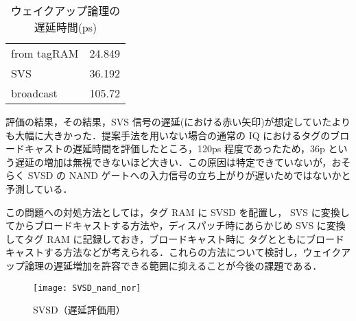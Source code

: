  \begin{table}[htb]
    \caption{ウェイクアップ論理の遅延時間(ps)}
    \footnotesize
    \center
      \begin{tabular}{l|l} \hline \hline
       from tagRAM & 24.849 \\
       SVS & 36.192 \\
       broadcast & 105.72 \\ \hline
    \end{tabular}
    \label{tab:delay}
  \end{table}

  評価の結果，その結果，SVS 信号の遅延(における赤い矢印)が想定していたよりも大幅に大きかった．提案手法を用いない場合の通常の IQ におけるタグのブロードキャストの遅延時間を評価したところ，120ps 程度であったため，36p という遅延の増加は無視できないほど大きい．この原因は特定できていないが，おそらく SVSD の NAND ゲートへの入力信号の立ち上がりが遅いためではないかと予測している．

  この問題への対処方法としては，タグ RAM に SVSD を配置し， SVS に変換してからブロードキャストする方法や，ディスパッチ時にあらかじめ SVS に変換してタグ RAM に記録しておき，ブロードキャスト時に タグとともにブロードキャストする方法などが考えられる．これらの方法について検討し，ウェイクアップ論理の遅延増加を許容できる範囲に抑えることが今後の課題である．
  
\begin{figure}[htb]
  \centering
  \texttt{[image: SVSD\_nand\_nor]}
  \caption{SVSD（遅延評価用）}
  \label{fig:SVSD_nand_nor}
\end{figure}
